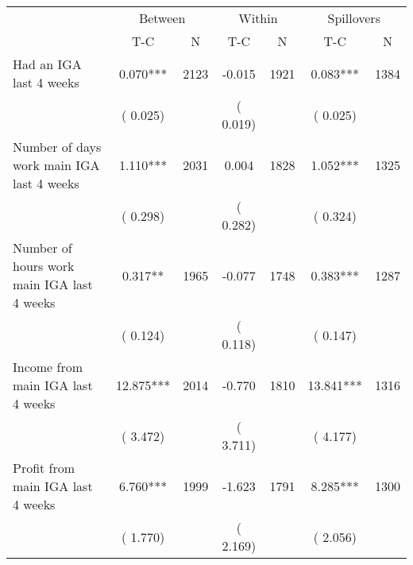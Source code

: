 
\begin{tabular}{l*{6}{c}}\hline&\multicolumn{2}{c}{Between}&\multicolumn{2}{c}{Within}&\multicolumn{2}{c}{Spillovers} \\ \cmidrule(r){2-3}\cmidrule(l){4-5}\cmidrule(l){6-7} & {T-C} & {N} & {T-C} & {N}  & {T-C}  & {N}  \\ \midrule
Had an IGA last 4 weeks        &              0.070***      &       2123       &             -0.015      &       1921       &              0.083***      &       1384       \\
                       &       (       0.025)            &                               &       (       0.019)            &                               &       (       0.025)            &                               \\
Number of days work main IGA last 4 weeks        &              1.110***      &       2031       &              0.004      &       1828       &              1.052***      &       1325       \\
                       &       (       0.298)            &                               &       (       0.282)            &                               &       (       0.324)            &                               \\
Number of hours work main IGA last 4 weeks        &              0.317**      &       1965       &             -0.077      &       1748       &              0.383***      &       1287       \\
                       &       (       0.124)            &                               &       (       0.118)            &                               &       (       0.147)            &                               \\
Income from main IGA last 4 weeks        &             12.875***      &       2014       &             -0.770      &       1810       &             13.841***      &       1316       \\
                       &       (       3.472)            &                               &       (       3.711)            &                               &       (       4.177)            &                               \\
Profit from main IGA last 4 weeks        &              6.760***      &       1999       &             -1.623      &       1791       &              8.285***      &       1300       \\
                       &       (       1.770)            &                               &       (       2.169)            &                               &       (       2.056)            &                               \\

\end{tabular}
